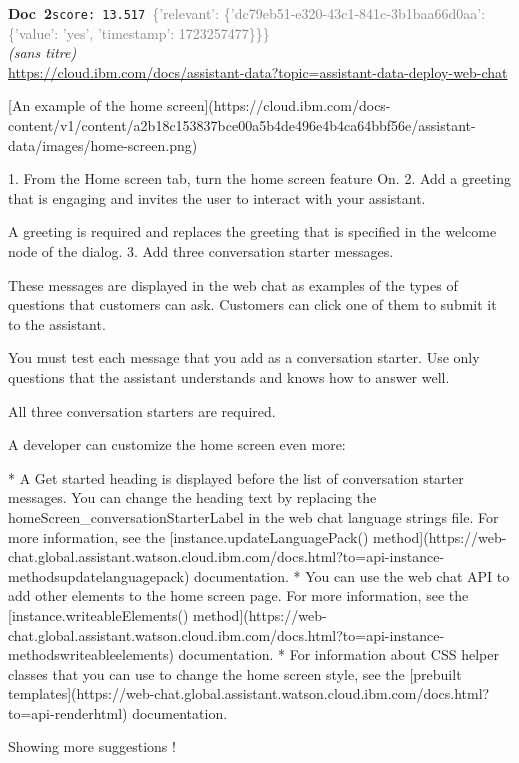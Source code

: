 \documentclass[a4paper,11pt]{article}
\begin{document}
\begin{docenv}
{\footnotesize\textcolor{doccolor}{\textbf{Doc~2}}}\hfill{\tiny\texttt{score:~13.517}}\ {\tiny\textcolor{gray}{\{'relevant': \{'dc79eb51-e320-43c1-841c-3b1baa66d0aa': \{'value': 'yes', 'timestamp': 1723257477\}\}\}}}\\[3pt]
{\small\textit{(sans titre)}}\\[2pt]
{\tiny\url{https://cloud.ibm.com/docs/assistant-data?topic=assistant-data-deploy-web-chat}}\\[4pt]
{\footnotesize 
[An example of the home screen](https://cloud.ibm.com/docs-content/v1/content/a2b18c153837bce00a5b4de496e4b4ca64bbf56e/assistant-data/images/home-screen.png)



1. From the Home screen tab, turn the home screen feature On.
2. Add a greeting that is engaging and invites the user to interact with your assistant.

A greeting is required and replaces the greeting that is specified in the welcome node of the dialog.
3. Add three conversation starter messages.

These messages are displayed in the web chat as examples of the types of questions that customers can ask. Customers can click one of them to submit it to the assistant.

You must test each message that you add as a conversation starter. Use only questions that the assistant understands and knows how to answer well.

All three conversation starters are required.



A developer can customize the home screen even more:



* A Get started heading is displayed before the list of conversation starter messages. You can change the heading text by replacing the homeScreen\_conversationStarterLabel in the web chat language strings file. For more information, see the [instance.updateLanguagePack() method](https://web-chat.global.assistant.watson.cloud.ibm.com/docs.html?to=api-instance-methodsupdatelanguagepack) documentation.
* You can use the web chat API to add other elements to the home screen page. For more information, see the [instance.writeableElements() method](https://web-chat.global.assistant.watson.cloud.ibm.com/docs.html?to=api-instance-methodswriteableelements) documentation.
* For information about CSS helper classes that you can use to change the home screen style, see the [prebuilt templates](https://web-chat.global.assistant.watson.cloud.ibm.com/docs.html?to=api-renderhtml) documentation.







 Showing more suggestions !}
\end{docenv}
\end{document}
